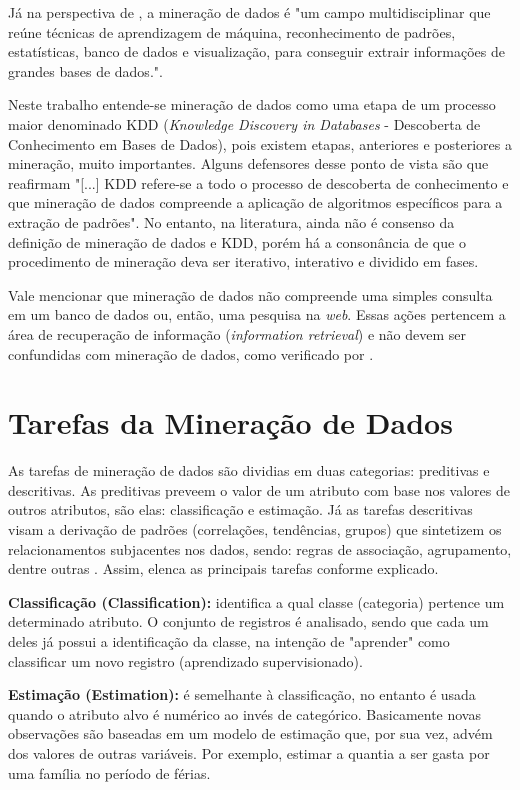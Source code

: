 \documentclass[projtg]{mdtufsm}
\begin{document}
Já na perspectiva de \cite{cabena}, a mineração de dados é "um campo multidisciplinar que reúne técnicas de aprendizagem de máquina, reconhecimento de padrões, estatísticas, banco de dados e visualização, para conseguir extrair informações de grandes bases de dados.". 

Neste trabalho entende-se mineração de dados como uma etapa de um processo maior denominado KDD ({\it Knowledge Discovery in Databases} - Descoberta de Conhecimento em Bases de Dados), pois existem etapas, anteriores e posteriores a mineração, muito importantes. Alguns defensores desse ponto de vista são \cite{fayyad} que reafirmam "[...] KDD refere-se a todo o processo de descoberta de conhecimento e que mineração de dados compreende a aplicação de algoritmos específicos para a extração de padrões". No entanto, na literatura, ainda não é consenso da definição de mineração de dados e KDD, porém há a consonância de que o procedimento de mineração deva ser iterativo, interativo e dividido em fases.  

Vale mencionar que mineração de dados não compreende uma simples consulta em um banco de dados ou, então, uma pesquisa na \textit{web}. Essas ações pertencem a área de recuperação de informação (\textit{information retrieval}) e não devem ser confundidas com mineração de dados, como verificado por \cite{pang-ning}.

\section{Tarefas da Mineração de Dados}

As tarefas de mineração de dados são dividias em duas categorias: preditivas e descritivas. As preditivas preveem o valor de um atributo com base nos valores de outros atributos, são elas: classificação e estimação. Já as tarefas descritivas visam a derivação de padrões (correlações, tendências, grupos) que sintetizem os relacionamentos subjacentes nos dados, sendo: regras de associação, agrupamento, dentre outras \cite{pang-ning}. Assim, \cite{larose2005} elenca as principais tarefas conforme explicado.

\textbf{Classificação (Classification):} identifica a qual classe (categoria) pertence um determinado atributo. O conjunto de registros é analisado, sendo que cada um deles já possui a identificação da classe, na intenção de "aprender" como classificar um novo registro (aprendizado supervisionado).

\textbf{Estimação (Estimation):} é semelhante à classificação, no entanto é usada quando o atributo alvo é numérico ao invés de categórico. Basicamente novas observações são baseadas em um modelo de estimação que, por sua vez, advém dos valores de outras variáveis. Por exemplo, estimar a quantia a ser gasta por uma família no período de férias. 
\end{document}
